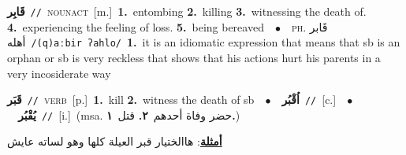 \documentclass[10pt,a4paper,twoside]{article} %
\begin{document}
\begin{multicols}{2}
{\setlength\topsep{0pt}\textbf{\foreignlanguage{arabic}{قَابِر}}\ {\color{gray}\texttt{//}\color{black}}\ \textsc{noun\textunderscore act}\ [m.]\ \textbf{1.}~entombing  \textbf{2.}~killing  \textbf{3.}~witnessing the death of.  \textbf{4.}~experiencing the feeling of loss.  \textbf{5.}~being bereaved\ \ $\bullet$\ \ \textsc{ph.} \color{gray} \foreignlanguage{arabic}{قَابر أهله}\color{black}\ {\color{gray}\texttt{/{\sffamily (q)aːbir ʔahlo}/}\color{black}}\ \textbf{1.}~it is an idiomatic expression that means that sb is an orphan or sb is very reckless that shows that his actions hurt his parents in a very incosiderate way\ } \vspace{2mm}

{\setlength\topsep{0pt}\textbf{\foreignlanguage{arabic}{قَبَر}}\ {\color{gray}\texttt{//}\color{black}}\ \textsc{verb}\ [p.]\ \textbf{1.}~kill  \textbf{2.}~witness the death of sb\ \ $\bullet$\ \ \setlength\topsep{0pt}\textbf{\foreignlanguage{arabic}{اُقْبُر}}\ {\color{gray}\texttt{//}\color{black}}\ [c.]\ \ $\bullet$\ \ \setlength\topsep{0pt}\textbf{\foreignlanguage{arabic}{يُقْبُر}}\ {\color{gray}\texttt{//}\color{black}}\ [i.]\ \color{gray}(msa. \foreignlanguage{arabic}{حضر وفاة أحدهم}~\foreignlanguage{arabic}{\textbf{٢.}}  \foreignlanguage{arabic}{قتل}~\foreignlanguage{arabic}{\textbf{١.}})\color{black}\  \begin{flushright}\color{gray}\foreignlanguage{arabic}{\textbf{\underline{\foreignlanguage{arabic}{أمثلة}}}: هاالختيار قبر العيلة كلها وهو لساته عايش}\end{flushright}\color{black}} \vspace{2mm}


\end{multicols}
\end{document}
